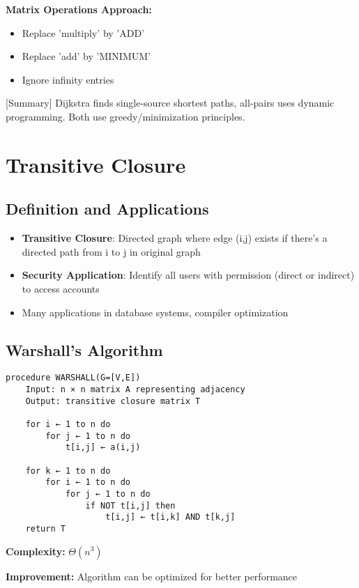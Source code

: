 \documentclass[12pt]{article}
\begin{document}
\textbf{Matrix Operations Approach:}
\begin{itemize}
    \item Replace 'multiply' by 'ADD'
    \item Replace 'add' by 'MINIMUM'
    \item Ignore infinity entries
\end{itemize}

[Summary] Dijkstra finds single-source shortest paths, all-pairs uses dynamic programming. Both use greedy/minimization principles.

\section{Transitive Closure}

\subsection{Definition and Applications}

\begin{itemize}
    \item \textbf{Transitive Closure}: Directed graph where edge (i,j) exists if there's a directed path from i to j in original graph
    \item \textbf{Security Application}: Identify all users with permission (direct or indirect) to access accounts
    \item Many applications in database systems, compiler optimization
\end{itemize}

\subsection{Warshall's Algorithm}

\begin{verbatim}
procedure WARSHALL(G=[V,E])
    Input: n × n matrix A representing adjacency
    Output: transitive closure matrix T
    
    for i ← 1 to n do
        for j ← 1 to n do
            t[i,j] ← a(i,j)
    
    for k ← 1 to n do
        for i ← 1 to n do
            for j ← 1 to n do
                if NOT t[i,j] then
                    t[i,j] ← t[i,k] AND t[k,j]
    return T
\end{verbatim}

\textbf{Complexity:} $\Theta(n^3)$

\textbf{Improvement:} Algorithm can be optimized for better performance
\end{document}
